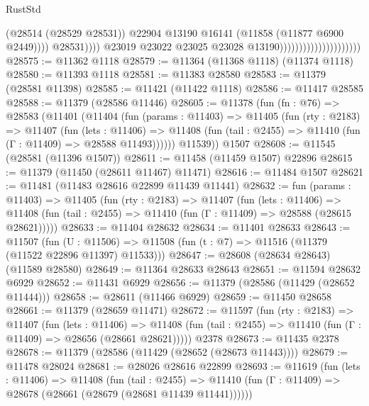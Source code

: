 \begin{lexlean}{RustStd}
\begin{coremodule}
                                                          (@28514 (@28529 @28531))
                                                          @22904
                                                          @13190
                                                          @16141
                                                          (@11858 (@11877 @6900 @2449))))
                                                      @28531))))
                                              @23019
                                              @23022
                                              @23025
                                              @23028
                                              @13190)))))))))))))))))))))
@28575 := @11362 @1118
@28579 := @11364 (@11368 @1118) (@11374 @1118)
@28580 := @11393 @1118
@28581 := @11383 @28580
@28583 := @11379 (@28581 @11398)
@28585 := @11421 (@11422 @1118)
@28586 := @11417 @28585
@28588 := @11379 (@28586 @11446)
@28605 := @11378
    (fun (fn : @76) =>
    @28583
      (@11401
        (@11404
          (fun (params : @11403) =>
          @11405
            (fun (rty : @2183) =>
            @11407
              (fun (lets : @11406) =>
              @11408 (fun (tail : @2455) => @11410 (fun (Γ : @11409) => @28588 @11493))))))
        @11539))
    @1507
@28608 := @11545 (@28581 (@11396 @1507))
@28611 := @11458 (@11459 @1507) @22896
@28615 := @11379 (@11450 (@28611 @11467) @11471)
@28616 := @11484 @1507
@28621 := @11481 (@11483 @28616 @22899 @11439 @11441)
@28632 := fun (params : @11403) =>
  @11405
    (fun (rty : @2183) =>
    @11407
      (fun (lets : @11406) =>
      @11408 (fun (tail : @2455) => @11410 (fun (Γ : @11409) => @28588 (@28615 @28621)))))
@28633 := @11404 @28632
@28634 := @11401 @28633
@28643 := @11507
    (fun (U : @11506) => @11508 (fun (t : @7) => @11516 (@11379 (@11522 @22896 @11397) @11533)))
@28647 := @28608 (@28634 @28643) (@11589 @28580)
@28649 := @11364 @28633 @28643
@28651 := @11594 @28632 @6929
@28652 := @11431 @6929
@28656 := @11379 (@28586 (@11429 (@28652 @11444)))
@28658 := @28611 (@11466 @6929)
@28659 := @11450 @28658
@28661 := @11379 (@28659 @11471)
@28672 := @11597
    (fun (rty : @2183) =>
    @11407
      (fun (lets : @11406) =>
      @11408 (fun (tail : @2455) => @11410 (fun (Γ : @11409) => @28656 (@28661 @28621)))))
    @2378
@28673 := @11435 @2378
@28678 := @11379 (@28586 (@11429 (@28652 (@28673 @11443))))
@28679 := @11478 @28024
@28681 := @28026 @28616 @22899
@28693 := @11619
    (fun (lets : @11406) =>
    @11408
      (fun (tail : @2455) =>
      @11410 (fun (Γ : @11409) => @28678 (@28661 (@28679 (@28681 @11439 @11441))))))

\end{coremodule}
\end{lexlean}
